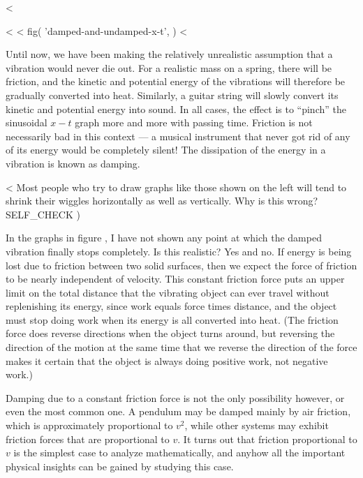 <%

<%
<%
  fig(
    'damped-and-undamped-x-t',
  )
<%

Until now, we have been making the relatively unrealistic
assumption that a vibration would never die out. For a
realistic mass on a spring, there will be friction, and the
kinetic and potential energy of the vibrations will
therefore be gradually converted into heat. Similarly, a
guitar string will slowly convert its kinetic and potential
energy into sound. In all cases, the effect is to ``pinch''
the sinusoidal $x-t$ graph more and more with passing time.
Friction is not necessarily bad in this context --- a
musical instrument that never got rid of any of its energy
would be completely silent! The dissipation of the energy in
a vibration is known as damping.

<%
Most people who try to draw graphs like those shown on the
left will tend to shrink their wiggles horizontally as well
as vertically. Why is this wrong?
  SELF_CHECK
  ) %

In the graphs in figure , I have not shown any point at
which the damped vibration finally stops completely. Is this
realistic? Yes and no. If energy is being lost due to
friction between two solid surfaces, then we expect the
force of friction to be nearly independent of velocity. This
constant friction force puts an upper limit on the total
distance that the vibrating object can ever travel without
replenishing its energy, since work equals force times
distance, and the object must stop doing work when its
energy is all converted into heat. (The friction force does
reverse directions when the object turns around, but
reversing the direction of the motion at the same time that
we reverse the direction of the force makes it certain that
the object is always doing positive work, not negative work.)

Damping due to a constant friction force is not the only
possibility however, or even the most common one. A pendulum
may be damped mainly by air friction, which is approximately
proportional to $v^2$, while other systems may exhibit
friction forces that are proportional to $v$. It turns out
that friction proportional to $v$ is the simplest case to
analyze mathematically, and anyhow all the important
physical insights can be gained by studying this case.


